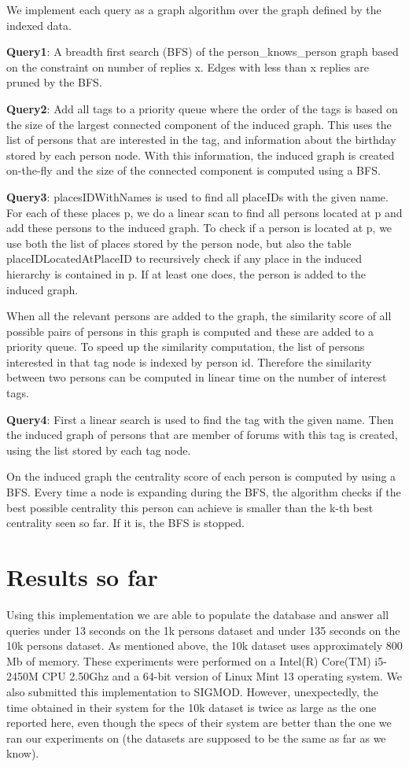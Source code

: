 \documentclass{article}
\begin{document}
We implement each query as a graph algorithm over the graph defined by
the indexed data.

\textbf{Query1}: A breadth first search (BFS) of the
person\_knows\_person graph based on the constraint on number of replies
x.  Edges with less than x replies are pruned by the BFS.

\textbf{Query2}: Add all tags to a priority queue where the order of
the tags is based on the size of the largest connected component of
the induced graph. This uses the list of persons that are interested in the 
tag, and information about the birthday stored by each person node. With
this information, the induced graph is created on-the-fly and the size 
of the connected component is computed using a BFS.
              
\textbf{Query3}: placesIDWithNames is used to find all placeIDs with
the given name. For each of these places p, we do a linear scan to find 
all persons located at p and add these persons to the induced graph. 
To check if a person is located at p, we use both the 
list of places stored by the person node, but also the table 
placeIDLocatedAtPlaceID to recursively check if any place 
in the induced hierarchy is contained in p. If at least one does, 
the person is added to the induced graph.
              
When all the relevant persons are added to the graph, 
the similarity score of all possible pairs of persons in this
graph is computed and these are added to a priority queue. To speed up
the similarity computation, the list of persons
interested in that tag node is indexed by person id. 
Therefore the similarity between two persons can be computed in 
linear time on the number of interest tags.
              
\textbf{Query4}: First a linear search is used to find the tag with
the given name. Then the induced graph of persons that are member of
forums with this tag is created, using the list stored by each tag node.
               
On the induced graph the centrality score of each person is computed
by using a BFS. Every time a node is expanding during the BFS, the
algorithm checks if the best possible centrality this person can
achieve is smaller than the k-th best centrality seen so far. If it
is, the BFS is stopped.

\section{Results so far}
Using this implementation we are able to populate the database and answer
all queries under 13 seconds on the 1k persons dataset and under 135 seconds on the 
10k persons dataset. As mentioned above, the 10k dataset uses approximately 800 Mb
of memory. These experiments were performed on a Intel(R) Core(TM) i5-2450M CPU 2.50Ghz
and a 64-bit version of Linux Mint 13 operating system. We also submitted this 
implementation to SIGMOD. However, unexpectedly, the time obtained in their
system for the 10k dataset is twice as large as the one reported here, even though the specs of their system are better than the one we ran our experiments on (the datasets are supposed to be the same as far as we know). 
\end{document}
